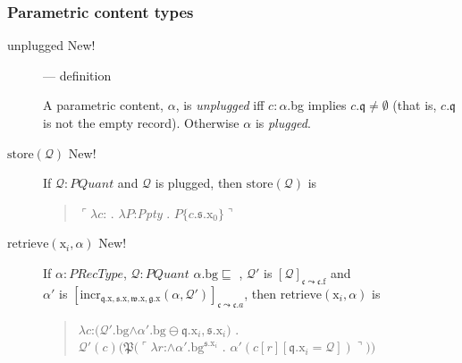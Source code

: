 \subsubsection{Parametric content types}
\begin{description}
\item[unplugged New!] --- definition

  A parametric content, $\alpha$, is \textit{unplugged} iff $c:\alpha$.bg implies $c.\mathfrak{q}\not=\emptyset$
(that is, $c.\mathfrak{q}$ is not the empty record).  Otherwise $\alpha$
is \textit{plugged}.

\item[\textnormal{$\mathrm{store}(\mathcal{Q})$} New!] \mbox{}

  If $\mathcal{Q}:\textit{PQuant}$ and $\mathcal{Q}$ is plugged, then
$\mathrm{store}(\mathcal{Q})$ is
\begin{quote}
  $\ulcorner\lambda c$: . $\lambda
  P$:\textit{Ppty} . $P\{c.\mathfrak{s}.\text{x}_0\}\urcorner$
\end{quote}

\item[\textnormal{$\mathrm{retrieve}(\text{x}_i,\alpha)$} New!]
  \mbox{}

    If $\alpha:\textit{PRecType}$, $\mathcal{Q}:\textit{PQuant}$ 
  $\alpha.\text{bg}\sqsubseteq$ , $\mathcal{Q}'$ is
$[\mathcal{Q}]_{\mathfrak{c}\leadsto\mathfrak{c}.\text{f}}$ and\\
$\alpha'$ is
$[\mathrm{incr}_{\mathfrak{q}.\text{x},\mathfrak{s}.\text{x},\mathfrak{w}.\text{x},\mathfrak{g}.\text{x}}(\alpha,\mathcal{Q}')]_{\mathfrak{c}\leadsto\mathfrak{c}.a}$, then
  $\mathrm{retrieve}(\text{x}_i,\alpha)$ is
  \begin{quote}
    $\lambda
    c$:$(\mathcal{Q}'.\text{bg}$\d{$\wedge$}$\alpha'.\text{bg}\ominus\mathfrak{q}.\text{x}_i,\mathfrak{s}.\text{x}_i)$
    . \\ \hspace*{2em}$\mathcal{Q'}(c)(\mathfrak{P}(\ulcorner\lambda
    r$:\d{$\wedge$}$\alpha'.\text{bg}^{\mathfrak{s}.\text{x}_i}$
    . $\alpha'(c[r][\mathfrak{q}.\text{x}_i=\mathcal{Q}])\urcorner))$
  \end{quote}



\end{description}



